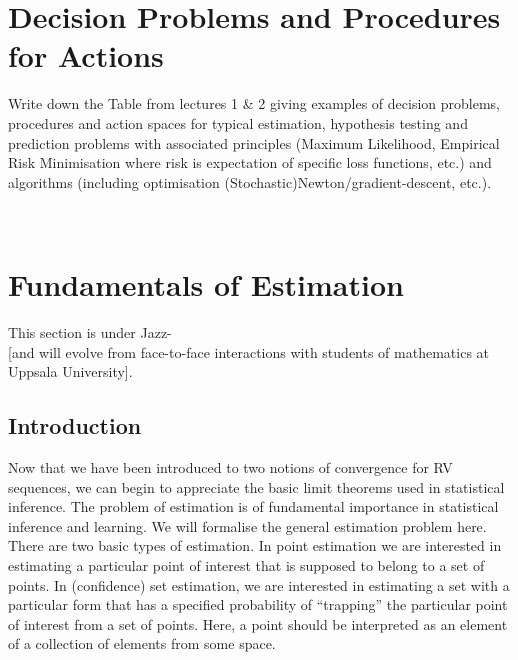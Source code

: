 \section{Decision Problems and Procedures for Actions}\label{S:Decisions}

Write down the Table from lectures 1 \& 2 giving examples of decision problems, procedures and action spaces for typical estimation, hypothesis testing and prediction problems with associated principles (Maximum Likelihood, Empirical Risk Minimisation where risk is expectation of specific loss functions, etc.) and algorithms (including optimisation (Stochastic)Newton/gradient-descent, etc.).

\vspace{10cm}~\\

\section{Fundamentals of Estimation}
This section is under Jazz-\work\\{\scriptsize [and will evolve from face-to-face interactions with students of mathematics at Uppsala University]}.

\subsection{Introduction}
Now that we have been introduced to two notions of convergence for RV sequences, we can begin to appreciate the basic limit theorems used in statistical inference.  The problem of estimation is of fundamental importance in statistical inference and learning.  We will formalise the general estimation problem here.  There are two basic types of estimation.  In point estimation we are interested in estimating a particular point of interest that is supposed to belong to a set of points.  In (confidence) set estimation, we are interested in estimating a set with a particular form that has a specified probability of ``trapping'' the particular point of interest from a set of points.  Here, a point should be interpreted as an element of a collection of elements from some space.

